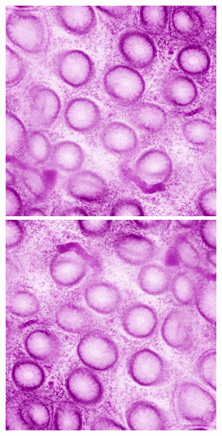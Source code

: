 \begin{figure}[H]
	\centering
	
	\begin{minipage}{0.25\columnwidth}
		\centering
		\includegraphics[clip, width=\linewidth]{fig/preprocessing/data_aug/horizontal_flip/horizontal_flip}
	\end{minipage}
	\begin{minipage}{0.1\columnwidth}
		\hspace{2truemm}
	\end{minipage}
	\begin{minipage}{0.25\columnwidth}
		\centering
		\includegraphics[clip, width=\linewidth]{fig/preprocessing/data_aug/vertical_flip/vertical_flip}
	\end{minipage}
	

\end{figure}
